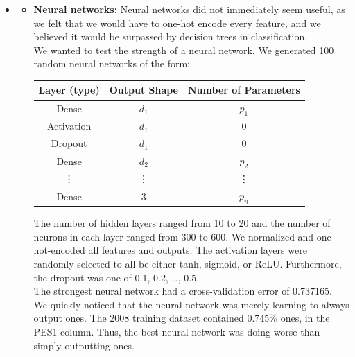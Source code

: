 \begin{itemize}
\begin{itemize}
    \end{itemize}

    \pagebreak

    \item {}
        \begin{itemize}
    \item \textbf{Neural networks:}
        Neural networks did not immediately seem useful, as we felt that we
        would have to one-hot encode every feature, and we believed it would
        be surpassed by decision trees in classification. \\

        We wanted to test the strength of a neural network. We generated 100
        random neural networks of the form:
        \begin{center}
            \begin{tabular}{ c c c }
                \hline
                Layer (type) & Output Shape & Number of Parameters \\
                \hline
                Dense & $d_1$ & $p_1$ \\
                Activation & $d_1$ & 0 \\
                Dropout & $d_1$ & 0 \\
                \hline
                Dense & $d_2$ &  $p_2$ \\
                \vdots & \vdots & \vdots \\
                \hline
                Dense & 3 & $p_n$ \\
            \end{tabular}
        \end{center}
        The number of hidden layers ranged from 10 to 20 and the number of
        neurons in each layer ranged from 300 to 600. We normalized and
        one-hot-encoded all features and outputs. The activation layers were
        randomly selected to all be either tanh, sigmoid, or ReLU. Furthermore,
        the dropout was one of 0.1, 0.2, \dots, 0.5. \\

        The strongest neural network had a cross-validation error of 0.737165. \\

        We quickly noticed that the neural network was merely learning to
        always output ones. The 2008 training dataset contained 0.745\% ones,
        in the PES1 column. Thus, the best neural network was doing worse than
        simply outputting ones.


\end{itemize}
\end{itemize}
